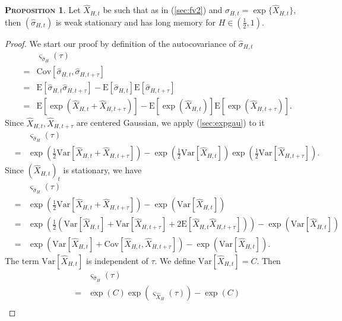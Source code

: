 \documentclass[a4paper, twoside, 11pt]{article}
\theoremstyle{definition}
\newtheorem{proposition}[definition]{\scshape Proposition}
\begin{document}
\begin{proposition}
  Let $\hat{X}_{H,t}$ be such that as in (\ref{sec:fv2}) and $\hat{\sigma}_{H,t} = \exp\{\hat{X}_{H,t}\}$, then $(\hat{\sigma}_{H,t})$ is weak stationary and has long memory for $H\in(\frac{1}{2}, 1)$. 
\end{proposition}
\begin{proof}
  We start our proof by definition of the autocovariance of $\hat{\sigma}_{H,t}$
  \begin{eqnarray*}
	&& \varsigma_{\hat{\sigma}_H}(\tau) \\
	&=& \mathrm{Cov}[\hat{\sigma}_{H,t}, \hat{\sigma}_{H, t+\tau}]\\
	&=& \mathrm{E}[\hat{\sigma}_{H,t} \hat{\sigma}_{H, t+\tau}] - \mathrm{E}[\hat{\sigma}_{H,t}]\mathrm{E}[\hat{\sigma}_{H,t+\tau}]\\
	&=& \mathrm{E}[\exp(\hat{X}_{H,t} + \hat{X}_{H, t+\tau})] - \mathrm{E}[\exp(\hat{X}_{H,t})]\mathrm{E}[\exp(\hat{X}_{H,t+\tau})] .
  \end{eqnarray*}
  Since $\hat{X}_{H,t}, \hat{X}_{H,t+\tau}$ are centered Gaussian, we apply (\ref{sec:expgau}) to it
  \begin{eqnarray*}
	&& \varsigma_{\hat{\sigma}_H}(\tau) \\
	&=& \exp(\frac{1}{2}\mathrm{Var}[\hat{X}_{H,t} + \hat{X}_{H, t+\tau}]) - \exp(\frac{1}{2}\mathrm{Var}[\hat{X}_{H,t}])  \exp(\frac{1}{2}\mathrm{Var}[\hat{X}_{H,t+\tau}]).
  \end{eqnarray*}
  Since $(\hat{X}_{H,t})_t$ is stationary, we have
  \begin{eqnarray*}
	&& \varsigma_{\hat{\sigma}_H}(\tau) \\
	&=&  \exp(\frac{1}{2}\mathrm{Var}[\hat{X}_{H,t} + \hat{X}_{H, t+\tau}]) - \exp(\mathrm{Var}[\hat{X}_{H,t}])\\
	&=& \exp(\frac{1}{2}(\mathrm{Var}[\hat{X}_{H,t}] + \mathrm{Var}[\hat{X}_{H,t+\tau}] + 2\mathrm{E}[\hat{X}_{H,t}\hat{X}_{H,t+\tau}])) - \exp(\mathrm{Var}[\hat{X}_{H,t}])\\
	&=& \exp(\mathrm{Var}[\hat{X}_{H,t}] + \mathrm{Cov}[\hat{X}_{H,t}, \hat{X}_{H,t+\tau}]) - \exp(\mathrm{Var}[\hat{X}_{H,t}]).
  \end{eqnarray*}
  The term $\mathrm{Var}[\hat{X}_{H,t}]$ is independent of $\tau$. We define $\mathrm{Var}[\hat{X}_{H,t}] = C$. Then
\begin{eqnarray*}
	&& \varsigma_{\hat{\sigma}_H}(\tau) \\
	&=& \exp(C) \exp(\varsigma_{\hat{X}_{H}}(\tau)) - \exp(C)\\

\end{eqnarray*}
\end{proof}
\end{document}
